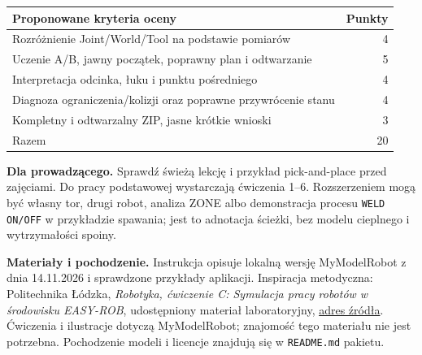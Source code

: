 \documentclass[10pt,a4paper]{article}
\newcommand{\cmd}[1]{\texttt{#1}}
\begin{document}
\begin{tabularx}{\linewidth}{@{}Xr@{}}\toprule
\textbf{Proponowane kryteria oceny}&\textbf{Punkty}\\\midrule
Rozróżnienie Joint/World/Tool na podstawie pomiarów&4\\
Uczenie A/B, jawny początek, poprawny plan i odtwarzanie&5\\
Interpretacja odcinka, łuku i punktu pośredniego&4\\
Diagnoza ograniczenia/kolizji oraz poprawne przywrócenie stanu&4\\
Kompletny i odtwarzalny ZIP, jasne krótkie wnioski&3\\\midrule
Razem&20\\\bottomrule
\end{tabularx}
\textbf{Dla prowadzącego.} Sprawdź świeżą lekcję i przykład pick-and-place przed zajęciami. Do pracy podstawowej wystarczają ćwiczenia 1--6. Rozszerzeniem mogą być własny tor, drugi robot, analiza ZONE albo demonstracja procesu \cmd{WELD ON/OFF} w przykładzie spawania; jest to adnotacja ścieżki, bez modelu cieplnego i wytrzymałości spoiny.

{\footnotesize\textbf{Materiały i pochodzenie.} Instrukcja opisuje lokalną wersję MyModelRobot z dnia 14.11.2026 i sprawdzone przykłady aplikacji. Inspiracja metodyczna: Politechnika Łódzka, \textit{Robotyka, ćwiczenie C: Symulacja pracy robotów w środowisku EASY-ROB}, udostępniony materiał laboratoryjny, \href{https://automatyka.p.lodz.pl/sites/i21/files/2026-02/stanowisko_c_-_easy-_rob.pdf}{adres źródła}. Ćwiczenia i ilustracje dotyczą MyModelRobot; znajomość tego materiału nie jest potrzebna. Pochodzenie modeli i licencje znajdują się w \cmd{README.md} pakietu.}
\end{document}
